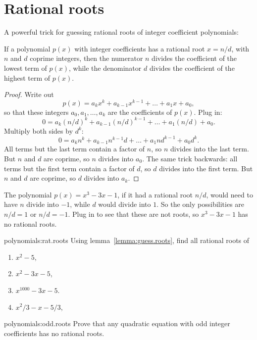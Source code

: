 \section{Rational roots}
A powerful trick for guessing rational roots of integer coefficient polynomials:
\begin{lemma}\label{lemma:guess.roots}
If a polynomial \(p(x)\) with integer coefficients has a rational root \(x=n/d\), with \(n\) and \(d\) coprime integers, then the numerator \(n\) divides the coefficient of the lowest term of \(p(x)\), while the denominator \(d\) divides the coefficient of the highest term of \(p(x)\).
\end{lemma}
\begin{proof}
Write out 
\[
p(x)=a_k x^k + a_{k-1} x^{k-1} + \dots + a_1 x + a_0,
\]
so that these integers \(a_0, a_1, \dots, a_k\) are the coefficients of \(p(x)\).
Plug in:
\[
0 = a_k (n/d)^k + a_{k-1} (n/d)^{k-1} + \dots + a_1 (n/d) + a_0.
\]
Multiply both sides by \(d^k\):
\[
0 = a_k n^k + a_{k-1} n^{k-1} d  + \dots + a_1 n d^{k-1} + a_0 d^k.
\]
All terms but the last term contain a factor of \(n\), so \(n\) divides into the last term.
But \(n\) and \(d\) are coprime, so \(n\) divides into \(a_0\).
The same trick backwards: all terms but the first term contain a factor of \(d\), so \(d\) divides into the first term.
But \(n\) and \(d\) are coprime, so \(d\) divides into \(a_k\).
\end{proof}
\begin{example}\label{example:x.cubed}
The polynomial \(p(x)=x^3-3x-1\), if it had a rational root \(n/d\), would need to have \(n\) divide into \(-1\), while \(d\) would divide into \(1\).
So the only possibilities are \(n/d=1\) or \(n/d=-1\).
Plug in to see that these are not roots, so \(x^3-3x-1\) has no rational roots.
\end{example}
\begin{problem}{polynomials:rat.roots}
Using lemma~\vref{lemma:guess.roots}, find all rational roots of 
\begin{enumerate}
\item
\(x^2-5\),
\item
\(x^2-3x-5\),
\item
\(x^{1000}-3x-5\).
\item
\(x^2/3-x-5/3\),
\end{enumerate}
\end{problem}
\begin{problem}{polynomials:odd.roots}
Prove that any quadratic equation with odd integer coefficients has no rational roots.
\end{problem}

